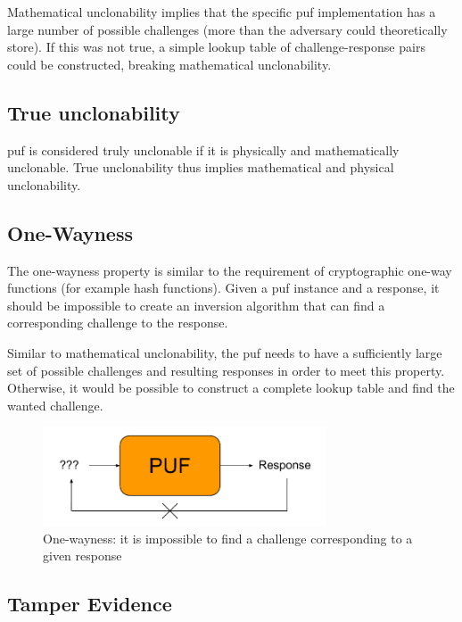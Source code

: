 Mathematical unclonability implies that the specific \gls{puf} implementation has a large number of possible challenges (more than the adversary could theoretically store). If this was not true, a simple lookup table of challenge-response pairs could be constructed, breaking mathematical unclonability. %

\subsection*{True unclonability}

\gls{puf} is considered truly unclonable if it is physically and mathematically unclonable. True unclonability thus implies mathematical and physical unclonability.

\subsection*{One-Wayness}

The one-wayness property is similar to the requirement of cryptographic one-way functions (for example hash functions). Given a \gls{puf} instance and a response, it should be impossible to create an inversion algorithm that can find a corresponding challenge to the response.

Similar to mathematical unclonability, the \gls{puf} needs to have a sufficiently large set of possible challenges and resulting responses in order to meet this property. Otherwise, it would be possible to construct a complete lookup table and find the wanted challenge.

\begin{figure}[h!]
    \centering
    \captionsetup{justification=centering,margin=0.5cm}
    \includegraphics[width=0.75\textwidth]{images/one-wayness}
    \caption{One-wayness: it is impossible to find a challenge corresponding to a given response}
    \label{fig:one-wayness}
\end{figure}

\subsection*{Tamper Evidence}

